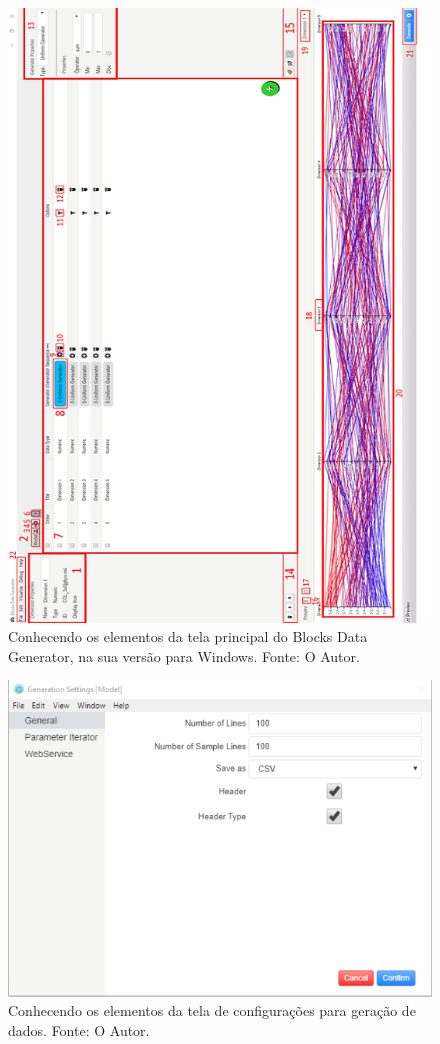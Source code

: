 \documentclass[
	12pt,				%
	openright,			%
	twoside,			%
	a4paper,			%
	english,			%
	brazil				%
	]{abntex2}
\begin{document}
		\begin{figure}[h]
			\centering
			\includegraphics[width=\linewidth]{./figures/prototipo/telaprincipalmarcada.png}
			\caption{Conhecendo os elementos da tela principal do Blocks Data Generator, na sua versão para Windows. Fonte: O Autor.}
			\label{fig:telaPrincipal}
		\end{figure}
		\begin{figure}[h]
			\centering
			\includegraphics[width=\linewidth]{./figures/prototipo/generationSettings.png}
			\caption{Conhecendo os elementos da tela de configurações para geração de dados. Fonte: O Autor.}
			\label{fig:generationSettings}
		\end{figure}
\end{document}
